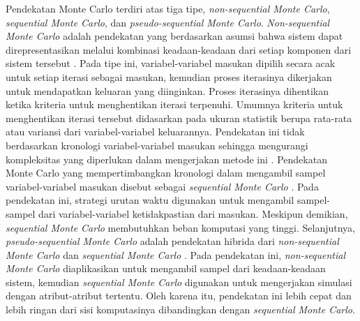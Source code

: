 {{Pendekatan Monte Carlo terdiri atas tiga tipe, \textit{non-sequential Monte Carlo}, \textit{sequential Monte Carlo}, dan \textit{pseudo-sequential Monte Carlo}. \textit{Non-sequential Monte Carlo} adalah pendekatan yang berdasarkan asumsi bahwa sistem dapat direpresentasikan melalui kombinasi keadaan-keadaan dari setiap komponen dari sistem tersebut \cite{Tao2018}. Pada tipe ini, variabel-variabel masukan dipilih secara acak untuk setiap iterasi sebagai masukan, kemudian proses iterasinya dikerjakan untuk mendapatkan keluaran yang diinginkan. Proses iterasinya dihentikan ketika kriteria untuk menghentikan iterasi terpenuhi. Umumnya kriteria untuk menghentikan iterasi tersebut didasarkan pada ukuran statistik berupa rata-rata atau variansi dari variabel-variabel keluarannya. Pendekatan ini tidak berdasarkan kronologi variabel-variabel masukan sehingga mengurangi kompleksitas yang diperlukan dalam mengerjakan metode ini \cite{Vallee2013}. Pendekatan Monte Carlo yang mempertimbangkan kronologi dalam mengambil sampel variabel-variabel masukan disebut sebagai \textit{sequential Monte Carlo} \cite{Arun2009}. Pada pendekatan ini, strategi urutan waktu digunakan untuk mengambil sampel-sampel dari variabel-variabel ketidakpastian dari masukan. Meskipun demikian, \textit{sequential Monte Carlo} membutuhkan beban komputasi yang tinggi\cite{Zio2015}. Selanjutnya, \textit{pseudo-sequential Monte Carlo} adalah pendekatan hibrida dari \textit{non-sequential Monte Carlo} dan \textit{sequential Monte Carlo} \cite{Billinton1994}. Pada pendekatan ini, \textit{non-sequential Monte Carlo} diaplikasikan untuk mengambil sampel dari keadaan-keadaan sistem, kemudian \textit{sequential Monte Carlo} digunakan untuk mengerjakan simulasi dengan atribut-atribut tertentu. Oleh karena itu, pendekatan ini lebih cepat dan lebih ringan dari sisi komputasinya dibandingkan dengan \textit{sequential Monte Carlo}\cite{Zhao2014}. 

}}
